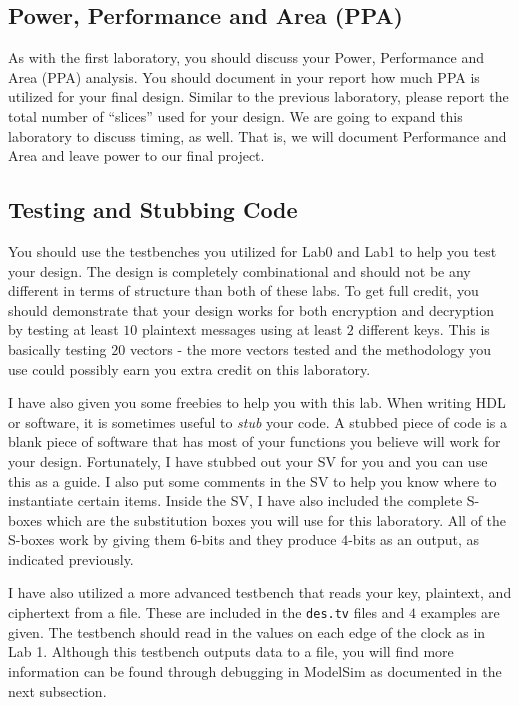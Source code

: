 \documentclass{article}
\begin{document}
\subsection{Power, Performance and Area (PPA)}

As with the first laboratory, you should discuss your
Power, Performance and Area (PPA)
analysis.  You should document in your report how much PPA is utilized
for your final design.  Similar to the previous laboratory, please report
the total number of ``slices'' used for your design.  We are going to
expand this laboratory to discuss timing, as well.  That is, we will
document Performance and Area and leave power to our final project.

\subsection{Testing and Stubbing Code}

You should use the testbenches you utilized for Lab0 and Lab1 to help
you test your design.  The design is completely combinational and
should not be any different in terms of structure than both of these
labs.  To get full credit, you should demonstrate that your design
works for both encryption and decryption by testing at least $10$
plaintext messages using at least $2$ different keys.  This is
basically testing $20$ vectors - the more vectors tested and the
methodology you use could possibly
earn you extra credit on this laboratory.

I have also given you some freebies to help you with this lab.  When
writing HDL or software, it is sometimes useful to \textit{stub} your
code.  A stubbed piece of code is a blank piece of software that has
most of your functions you believe will work for your design.
Fortunately, I have stubbed out your SV for you and you can use this
as a guide.  I also put some comments in the SV to help you know where
to instantiate certain items.
Inside the SV, I have also included the complete S-boxes
which are the substitution boxes you will use for
this laboratory.  All of the S-boxes work by giving them $6$-bits and
they produce $4$-bits as an output, as indicated previously.

I have also utilized a more advanced testbench that reads your
key, plaintext, and ciphertext from a file.  These are included in the
\verb!des.tv! files and $4$ examples are given.  The testbench should
read in the values on each edge of the clock as in Lab 1.  Although
this testbench outputs data to a file, you will find more information
can be found through debugging in ModelSim as documented in the next
subsection.
\end{document}
